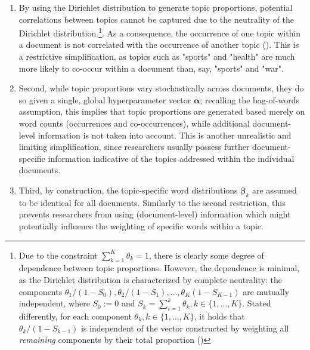 \begin{enumerate}[label=(\roman*)]
\vspace{-0.25cm}
\item By using the Dirichlet distribution to generate topic proportions, potential correlations between topics cannot be captured due to the neutrality of the Dirichlet distribution.\footnote{Due to the constraint $\sum_{k=1}^{K}\theta_{k}=1$, there is clearly some degree of dependence between topic proportions. However, the dependence is minimal, as the Dirichlet distribution is characterized by complete neutrality: the components $\theta_1/(1-S_0), \theta_2/(1-S_1),\dots, \theta_K(1-S_{K-1})$ are mutually independent, where $S_0:=0$ and $S_k = \sum_{i=1}^{k}\theta_k, k \in \{1,\dots,K\}$. Stated differently, for each component $\theta_k, k \in \{1,\dots,K\}$, it holds that $\theta_k/(1-S_{k-1})$ is independent of the vector constructed by weighting all \textit{remaining} components by their total proportion (\citealp{james1980new})}. As a consequence, the occurrence of one topic within a document is not correlated with the occurrence of another topic (\citealp{blei2007correlated}). This is a restrictive simplification, as topics such as "sports" and "health" are much more likely to co-occur within a document than, say, "sports" and "war".
\vspace{-0.25cm}
\item Second, while topic proportions vary stochastically across documents, they do so given a single, global hyperparameter vector $\boldsymbol{\alpha}$; recalling the bag-of-words assumption, this implies that topic proportions are generated based merely on word counts (occurrences and co-occurrences), while additional document-level information is not taken into account. This is another unrealistic and limiting simplification, since researchers usually possess further document-specific information indicative of the topics addressed within the individual documents.
\vspace{-0.25cm}
\item Third, by construction, the topic-specific word distributions $\boldsymbol{\beta}_k$ are assumed to be identical for all documents. Similarly to the second restriction, this prevents researchers from using (document-level) information which might potentially influence the weighting of specific words within a topic.

\end{enumerate}

